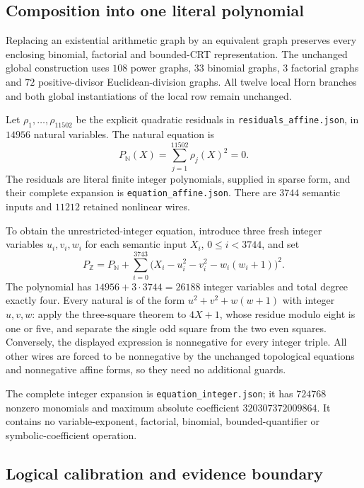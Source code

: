 \documentclass[11pt,letterpaper]{article}
\theoremstyle{remark}\newtheorem{remark}[theorem]{Remark}
\begin{document}
\subsection{Composition into one literal polynomial}

Replacing an existential arithmetic graph by an equivalent graph preserves
every enclosing binomial, factorial and bounded-CRT representation. The
unchanged global construction uses $108$ power graphs, $33$ binomial graphs,
$3$ factorial graphs and $72$ positive-divisor Euclidean-division graphs.
All twelve local Horn branches and both global instantiations of the local
row remain unchanged.

Let $\rho_1,\ldots,\rho_{11502}$ be the explicit quadratic residuals in
\texttt{residuals\_affine.json}, in $14956$ natural variables. The natural
equation is
\[
 P_{\mathbb N}(X)=\sum_{j=1}^{11502}\rho_j(X)^2=0.
\]
The residuals are literal finite integer polynomials, supplied in sparse
form, and their complete expansion is \texttt{equation\_affine.json}.
There are $3744$ semantic inputs and $11212$ retained nonlinear wires.

To obtain the unrestricted-integer equation, introduce three fresh integer
variables $u_i,v_i,w_i$ for each semantic input $X_i$, $0\leq i<3744$, and set
\[
 P_{\mathbb Z}
 =P_{\mathbb N}
  +\sum_{i=0}^{3743}
    \bigl(X_i-u_i^2-v_i^2-w_i(w_i+1)\bigr)^2.
\]
The polynomial has $14956+3\cdot3744=26188$ integer variables and total
degree exactly four. Every natural is of the form
$u^2+v^2+w(w+1)$ with integer $u,v,w$: apply the three-square theorem to
$4X+1$, whose residue modulo eight is one or five, and separate the single
odd square from the two even squares. Conversely, the displayed expression
is nonnegative for every integer triple. All other wires are forced to be
nonnegative by the unchanged topological equations and nonnegative affine
forms, so they need no additional guards.

The complete integer expansion is \texttt{equation\_integer.json}; it has
$724768$ nonzero monomials and maximum absolute coefficient
$320307372009864$. It contains no variable-exponent, factorial, binomial,
bounded-quantifier or symbolic-coefficient operation.

\subsection{Logical calibration and evidence boundary}
\end{document}

